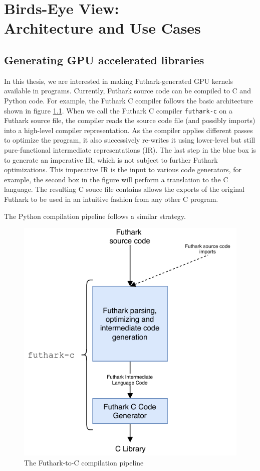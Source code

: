 \chapter{Birds-Eye View:\\Architecture and Use Cases}

\section{Generating GPU accelerated libraries}
In this thesis, we are interested in making Futhark-generated GPU kernels available
in \csharp{} programs.
Currently, Futhark source code can be compiled to C and Python code.
For example, the Futhark C compiler follows the basic architecture shown in
figure \ref{fig:ccompiler}.
When we call the Futhark C compiler \texttt{futhark-c} on a Futhark source file, 
the compiler reads the source code file (and possibly imports) into a high-level
compiler representation.
As the compiler applies different passes to optimize the program, it also 
successively re-writes it using lower-level but still pure-functional 
intermediate representations (IR).  The last step in the blue box is to generate
an imperative IR, which is not subject to further Futhark optimizations.
This imperative IR is the input to various code generators, for example, 
the second box in the figure will perform a translation to the C language.
The resulting C souce file contains allows the exports of the original Futhark 
to be used in an intuitive fashion from any other C program.

The Python compilation pipeline follows a similar strategy.

\begin{figure}[H]
  \centering
  \includegraphics{chapters/figs/architecture/ccompiler.pdf}
  \caption{The Futhark-to-C compilation pipeline}
  \label{fig:ccompiler}
\end{figure}

